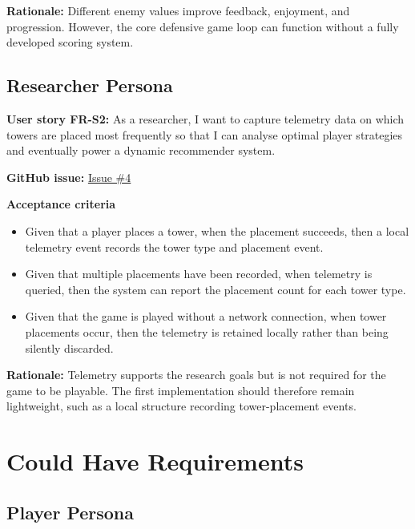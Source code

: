 \documentclass[12pt,a4paper]{article}
\begin{document}
\par\medskip
\textbf{Rationale:} Different enemy values improve feedback, enjoyment, and
progression. However, the core defensive game loop can function without a
fully developed scoring system.

\subsection{Researcher Persona}

\textbf{User story FR-S2:} As a researcher, I want to capture telemetry data on
which towers are placed most frequently so that I can analyse optimal player
strategies and eventually power a dynamic recommender system.

\textbf{GitHub issue:} \href{https://github.com/nexuma/tower-defence-final-project/issues/4}{Issue \#4}

\par\medskip
\noindent\textbf{Acceptance criteria}
\par\smallskip
\begin{itemize}[leftmargin=1.5em,itemsep=0.35em,topsep=0.2em]
    \item Given that a player places a tower, when the placement succeeds,
    then a local telemetry event records the tower type and placement event.
    \item Given that multiple placements have been recorded, when telemetry is
    queried, then the system can report the placement count for each tower
    type.
    \item Given that the game is played without a network connection, when
    tower placements occur, then the telemetry is retained locally rather than
    being silently discarded.
\end{itemize}

\par\medskip
\textbf{Rationale:} Telemetry supports the research goals but is not required
for the game to be playable. The first implementation should therefore remain
lightweight, such as a local structure recording tower-placement events.

\section{Could Have Requirements}
\label{sec:could-have}

\subsection{Player Persona}
\end{document}
